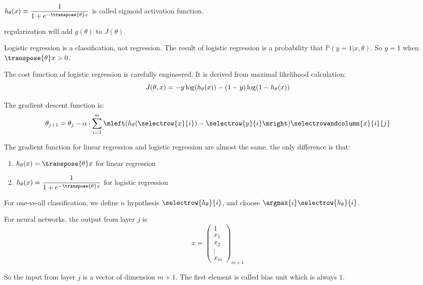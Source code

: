 $\displaystyle h_\theta(x) = \frac{1}{1 + e^{- \transpose{\theta} x}}$ is called sigmoid activation function.

regularization will add $g(\theta)$ to $J(\theta)$.

Logistic regression is a classification, not regression. The result of logistic regression is a probability that $\mathbb{P}(y = 1 | x, \theta)$. So $y = 1$ when $\transpose{\theta} x > 0$.

The cost function of logistic regression is carefully engineered. It is derived from maximal likelihood calculation:
\begin{equation}
    J(\theta,x) = -y \log \mleft(h_\theta (x) \mright) - (1-y) \log \mleft(1 - h_\theta (x)\mright)
\end{equation}

The gradient descent function is:
\begin{equation}
    \theta_{j+1} = \theta_j - \alpha  \cdot \sum_{i=1}^m \mleft( h_\theta (\selectrow{x}{i}) - \selectrow{y}{i} \mright) \selectrowandcolumn{x}{i}{j}
\end{equation}

The gradient function for linear regression and logistic regression are almost the same. the only difference is that:
\begin{enumerate}
    \item $h_\theta(x) = \transpose{\theta} x$ for linear regression
    \item $\displaystyle h_\theta (x) = \frac{1}{1 + e^{- \transpose{\theta} x}}$ for logistic regression
\end{enumerate}

For one-vs-all classification, we define $n$ hypothesis $\selectrow{h_\theta}{i}$, and choose $\argmax{i} \selectrow{h_\theta}{i}$.



For neural networks, the output from layer $j$ is 
\begin{equation}
    x = \begin{pmatrix}
        1 \\
        x_1 \\
        x_2 \\
        \vdots \\
        x_m
    \end{pmatrix}_{m+1}
\end{equation}

So the input from layer $j$ is a vector of dimension $m+1$. The first element is called bias unit which is always $1$.

